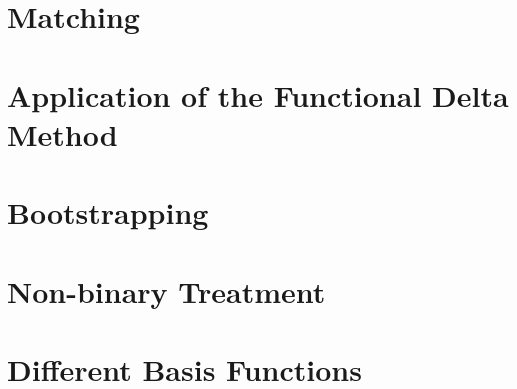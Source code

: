 \section{Matching}
  
\section{Application of the Functional Delta Method}
  
\section{Bootstrapping} 
  
\section{Non-binary Treatment}
  
\section{Different Basis Functions}
  
